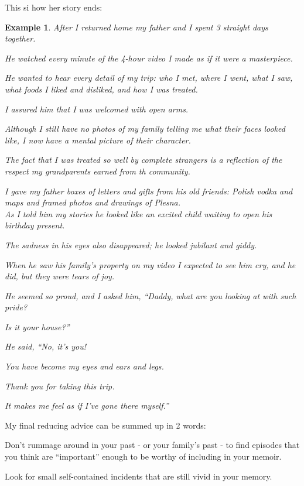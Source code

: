 \documentclass{book}
\numberwithin{equation}{section}
\newtheorem{example}{Example}[chapter]
\begin{document}
%
This si how her story ends:
\begin{example}
    After I returned home my father and I spent 3 straight days together.
    
    He watched every minute of the 4-hour video I made as if it were a masterpiece.
    
    He wanted to hear every detail of my trip: who I met, where I went, what I saw, what foods I liked and disliked, and how I was treated.
    
    I assured him that I was welcomed with open arms.
    
    Although I still have no photos of my family telling me what their faces looked like, I now have a mental picture of their character.
    
    The fact that I was treated so well by complete strangers is a reflection of the respect my grandparents earned from th community.
    
    I gave my father boxes of letters and gifts from his old friends: Polish vodka and maps and framed photos and drawings of Plesna.
    \\
    
    As I told him my stories he looked like an excited child waiting to open his birthday present.
    
    The sadness in his eyes also disappeared; he looked jubilant and giddy.
    
    When he saw his family's property on my video I expected to see him cry, and he did, but they were tears of joy.
    
    He seemed so proud, and I asked him, ``Daddy, what are you looking at with such pride?
    
    Is it your house?''
    
    He said, ``No, it's you!
    
    You have become my eyes and ears and legs.
    
    Thank you for taking this trip.
    
    It makes me feel as if I've gone there myself.''
\end{example}
My final reducing advice can be summed up in 2 words: 

Don't rummage around in your past - or your family's past - to find episodes that you think are ``important'' enough to be worthy of including in your memoir.

Look for small self-contained incidents that are still vivid in your memory.
\end{document}
